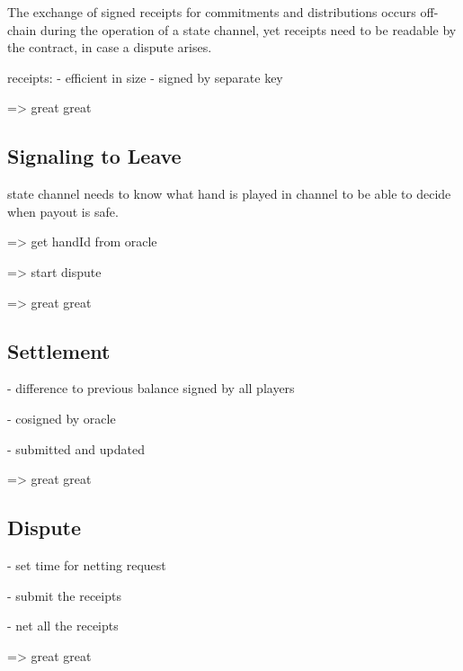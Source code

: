 The exchange of signed receipts for commitments and distributions occurs off-chain during the operation of a state channel, yet receipts need to be readable by the contract, in case a dispute arises.

receipts:
- efficient in size
- signed by separate key

=> great great

\subsection{Signaling to Leave}

state channel needs to know what hand is played in channel to be able to decide when payout is safe.

=> get handId from oracle

=> start dispute

=> great great

\subsection{Settlement}

- difference to previous balance signed by all players

- cosigned by oracle

- submitted and updated

=> great great

\subsection{Dispute}

- set time for netting request

- submit the receipts

- net all the receipts

=> great great

